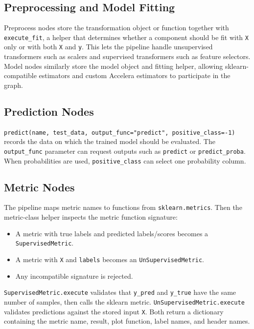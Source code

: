 \documentclass[11pt,a4paper]{article}
\begin{document}
\subsection{Preprocessing and Model Fitting}

Preprocess nodes store the transformation object or function together with
\texttt{execute\_fit}, a helper that determines whether a component should be
fit with \texttt{X} only or with both \texttt{X} and \texttt{y}. This lets the
pipeline handle unsupervised transformers such as scalers and supervised
transformers such as feature selectors. Model nodes similarly store the model
object and fitting helper, allowing sklearn-compatible estimators and custom
Accelera estimators to participate in the graph.

\subsection{Prediction Nodes}

\texttt{predict(name, test\_data, output\_func="predict", positive\_class=-1)}
records the data on which the trained model should be evaluated. The
\texttt{output\_func} parameter can request outputs such as \texttt{predict} or
\texttt{predict\_proba}. When probabilities are used, \texttt{positive\_class}
can select one probability column.

\subsection{Metric Nodes}

The pipeline maps metric names to functions from \texttt{sklearn.metrics}.
Then the metric-class helper inspects the metric function signature:

\begin{itemize}[leftmargin=*]
  \item A metric with true labels and predicted labels/scores becomes a
        \texttt{SupervisedMetric}.
  \item A metric with \texttt{X} and \texttt{labels} becomes an
        \texttt{UnSupervisedMetric}.
  \item Any incompatible signature is rejected.
\end{itemize}

\texttt{SupervisedMetric.execute} validates that \texttt{y\_pred} and
\texttt{y\_true} have the same number of samples, then calls the sklearn metric.
\texttt{UnSupervisedMetric.execute} validates predictions against the stored
input \texttt{X}. Both return a dictionary containing the metric name, result,
plot function, label names, and header names.
\end{document}
